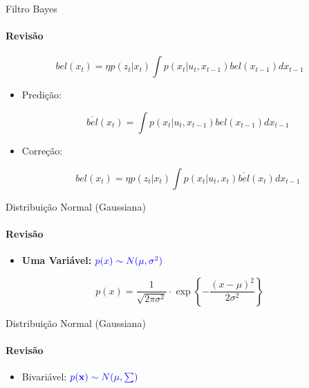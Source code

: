 \documentclass{beamer}
\begin{document}
\begin{frame}{Filtro Bayes}
    \framesubtitle{Revisão}
    
    \begin{block}{}
        \begin{equation*}
            bel(x_t) = \eta p(z_t| x_t) \int p(x_t| u_t, x_{t-1}) bel(x_{t-1})dx_{t-1}
        \end{equation*}
    \end{block}

    \begin{itemize}
        \item Predição:
        
        \begin{equation*}
            \overline{bel}(x_t) = \int p(x_t| u_t, x_{t-1}) bel(x_{t-1})dx_{t-1}
        \end{equation*}

        \item Correção:

        \begin{equation*}
            bel(x_t) = \eta p(z_t| x_t) \int p(x_t| u_t, x_{t}) \overline{bel}(x_{t})dx_{t-1}
        \end{equation*}
    \end{itemize}
\end{frame}


\begin{frame}{Distribuição Normal (Gaussiana)}
    \framesubtitle{Revisão}  
    \begin{itemize}
        \item \textbf{Uma Variável:} $\color{blue}{p(x) \sim N(\mu, \sigma^2)}$
    \end{itemize}

    \begin{block}{}
        \begin{equation*}
            p(x) = \dfrac{1}{\sqrt{2\pi\sigma^2}}\cdot 
        \exp\left\{-\frac{(x-\mu)^2}{2\sigma^2}\right\}
        \end{equation*}
    \end{block}

    \centering
    
\end{frame}


\begin{frame}{Distribuição Normal (Gaussiana)}
    \framesubtitle{Revisão}
    \begin{itemize}
        \item Bivariável: $\color{blue}{p(\mathbf{x}) \sim N(\mu, \sum)}$
    \end{itemize}
    \centering
    
\end{frame}
\end{document}

